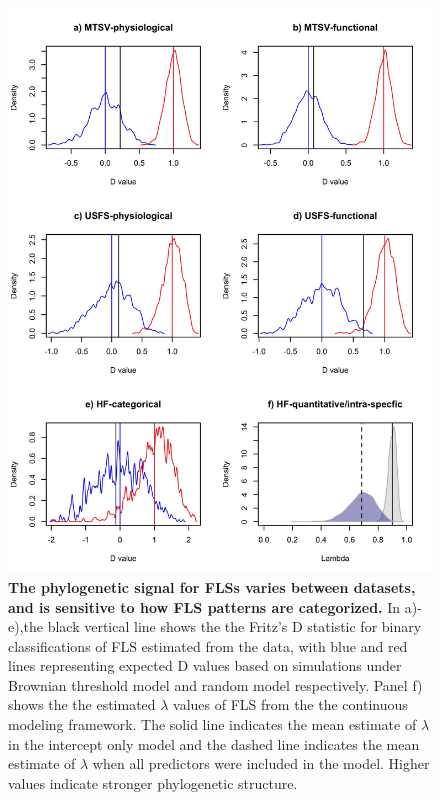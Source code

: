 \documentclass[11pt]{article}
\begin{document}
\begin{figure}[H]
\centering
\includegraphics[height=0.8\textheight]{..//..//phylosig.jpeg} 
  \caption{\textbf{The phylogenetic signal for FLSs varies between datasets, and is sensitive to how FLS patterns are categorized.} In a)-e),the black vertical line shows the the Fritz's D statistic for binary classifications of FLS estimated from the data, with blue and red lines representing expected D values based on simulations under Brownian threshold model and random model respectively. Panel f) shows the the estimated $\lambda$ values of FLS from the the continuous modeling framework. The solid line indicates the mean estimate of $\lambda$ in the intercept only model and the dashed line indicates the mean estimate of $\lambda$ when all predictors were included in the model. Higher values indicate stronger phylogenetic structure.}
    \label{fig:Dstat}
    \end{figure}
\end{document}
